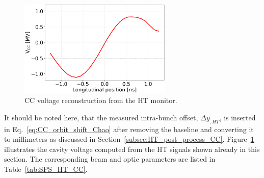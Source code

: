 \begin{figure}[!h]
\centering         
\includegraphics[width=0.65\textwidth]{images/Ch4/HT_VCC_callibration_20180530_135105.png}
    \caption{CC voltage reconstruction from the HT monitor.}
    \label{fig:VCC_from_HT_monitor_measurement}
\end{figure}

It should be noted here, that the measured intra-bunch offset, $\Delta y_{, HT}$, is inserted in Eq.~\eqref{eq:CC_orbit_shift_Chao} after removing the baseline and converting it to millimeters as discussed in Section~\ref{subsec:HT_post_process_CC}. Figure~\ref{fig:VCC_from_HT_monitor_measurement} illustrates the cavity voltage computed from the HT signals shown already in this section. The corresponding beam and optic parameters are listed in Table~\ref{tab:SPS_HT_CC}.

